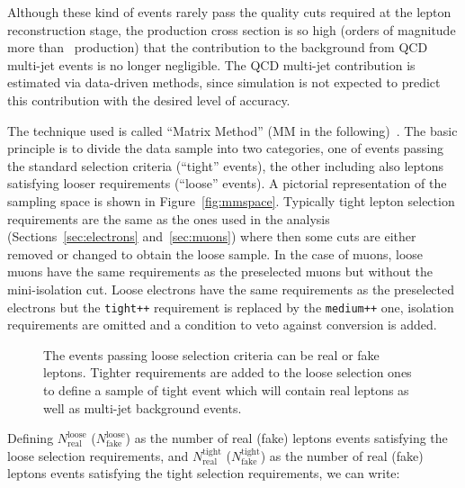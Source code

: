 Although these kind of events rarely pass the quality cuts 
required at the lepton reconstruction stage, the production cross section
is so high (orders  of magnitude more than \ttbar\ production)
that the contribution to the background from QCD multi-jet events is
no longer negligible. The QCD multi-jet contribution
is estimated via data-driven 
methods, since simulation is not expected to predict this contribution
with the desired level of accuracy.

The technique used is called ``Matrix Method'' (MM in the following)~\cite{ttbar_3pb}.  
The basic principle is to divide the data sample into two categories, one
of events passing the standard selection criteria (``tight'' events), the
other including also leptons satisfying looser requirements (``loose'' events). 
A pictorial representation of the sampling space 
is shown in Figure~\ref{fig:mmspace}. Typically tight lepton selection requirements
are the same as the ones used in the analysis (Sections~\ref{sec:electrons}
and~\ref{sec:muons}) where then some cuts are either removed or changed
to obtain the loose sample. In the case of muons, loose muons have the same
requirements as the preselected  
muons but without the mini-isolation cut. Loose electrons  have the same
requirements as the preselected  
electrons but the \texttt{tight++} requirement is replaced
by the \texttt{medium++} one, isolation requirements are omitted and
a condition to veto against conversion is added.

\begin{figure}[htb]\begin{center}
	\caption{The events passing loose selection criteria can be real or fake leptons.
        Tighter requirements are added to the loose selection ones to define a sample of
        tight event which will contain real leptons as well as multi-jet background events.}
\end{center}\end{figure}

Defining $N^\mathrm{loose}_\mathrm{real}$ ($N^\mathrm{loose}_\mathrm{fake}$) as the number of
real (fake) leptons events satisfying the loose selection requirements, and
$N^\mathrm{tight}_\mathrm{real}$ ($N^\mathrm{tight}_\mathrm{fake}$) as the number of
real (fake) leptons events satisfying the tight selection requirements, we can write:

